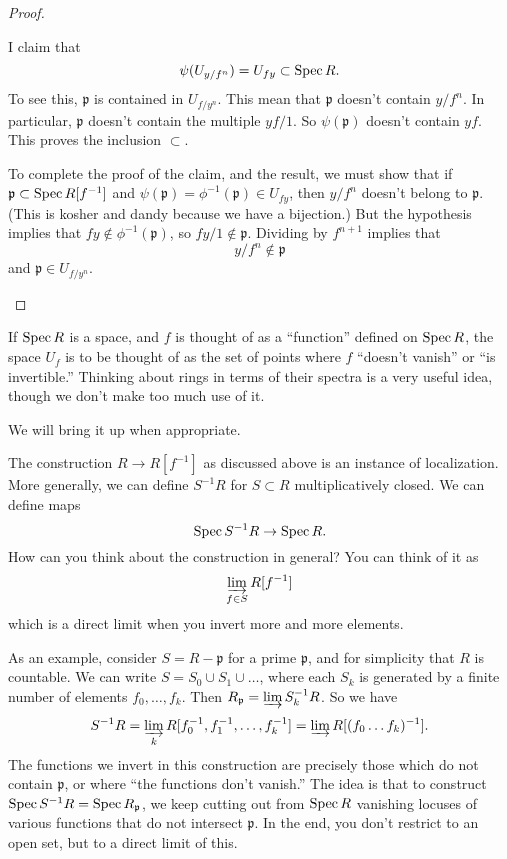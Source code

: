 \begin{proof}
\begin{enumerate}
I claim that
\[ \psi(U_{y/f^n}) = U_{fy} \subset \operatorname{Spec} R.  \]
To see this, $\mathfrak{p}$ is contained in $U_{f/y^n}$. This mean that
$\mathfrak{p}$ doesn't contain $y/f^n$.  In particular, $\mathfrak{p}$ doesn't
contain  the multiple $yf/1$.  So $\psi(\mathfrak{p})$ doesn't contain $yf$.
This proves the inclusion $\subset$.  

To complete the proof of the claim, and
the result, we must show that if $\mathfrak{p} \subset \operatorname{Spec} R[f^{-1}]$ and
$\psi(\mathfrak{p}) = \phi^{-1}(\mathfrak{p}) \in U_{fy}$, then $y/f^n$ doesn't
belong to $\mathfrak{p}$.  (This is kosher and dandy because we have a bijection.) But the hypothesis implies that $fy \notin
\phi^{-1}(\mathfrak{p})$, so $fy/1 \notin \mathfrak{p}$.  Dividing by $f^{n+1}$
implies that
\[ y/f^{n} \notin \mathfrak{p}  \]
and $\mathfrak{p} \in U_{f/y^n}$. \qedhere
\end{enumerate}
\end{proof} 

If $\operatorname{Spec} R$ is a space, and $f$ is thought of as a ``function'' defined on
$\operatorname{Spec} R$, the space $U_f$ is to be thought of as the set of points where $f$
``doesn't vanish'' or ``is invertible.''
Thinking about rings in terms of their spectra is a very useful idea, though we
don't make too much use of it. 

We will bring it up when appropriate.  

\begin{remark} 
The construction $R \to R[f^{-1}]$ as discussed above is an instance of
localization.  More generally, we can define $S^{-1}R$ for $S \subset R$
multiplicatively closed. We can define maps
\[ \operatorname{Spec} S^{-1}R \to \operatorname{Spec} R . \]
How can you think about the construction in general? You can think of it as
\[ \varinjlim_{f \in S} R[f^{-1}]  \]
which is a direct limit when you invert more and more elements.  

As an example, consider $S = R - \mathfrak{p}$ for a prime $\mathfrak{p}$, and for
simplicity that $R$ is countable. We can write $S =
S_0 \cup S_1 \cup \dots$, where each $S_k$ is generated by a finite number of
elements $f_0, \dots, f_k$.  Then $R_{\mathfrak{p}} = \varinjlim S_k^{-1} R$.
So we have
\[ S^{-1}R = \varinjlim_k R[f_0^{-1} , f_1^{-1}, \dots, f_k^{-1}  ] = \varinjlim
R[(f_0\dots f_k)^{-1}]. \]
The functions we invert in this construction are precisely those which do not
contain $\mathfrak{p}$, or where ``the functions don't vanish.''  The idea is
that to construct $\operatorname{Spec} S^{-1}R = \operatorname{Spec} R_{\mathfrak{p}}$, we keep cutting out
from $\operatorname{Spec} R$ vanishing locuses of various functions that do not
intersect $\mathfrak{p}$.  In the end, you don't restrict to an open set, but
to a direct limit of this.
\end{remark} 

